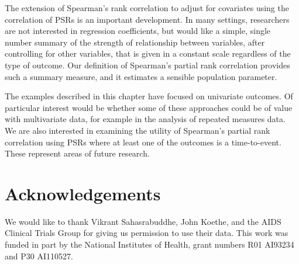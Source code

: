 \documentclass[12pt, usenatbib]{article}
\begin{document}
The extension of Spearman's rank correlation to adjust for covariates using the correlation of PSRs is an important development.  In many settings, researchers are not interested in regression coefficients, but would like a simple, single number summary of the strength of relationship between variables, after controlling for other variables, that is given in a constant scale regardless of the type of outcome.  Our definition of Spearman's partial rank correlation provides such a summary measure, and it estimates a sensible population parameter.

The examples described in this chapter have focused on univariate outcomes.  Of particular interest would be whether some of these approaches could be of value with multivariate data, for example in the analysis of repeated measures data.  We are also interested in examining the utility of Spearman's partial rank correlation using PSRs where at least one of the outcomes is a time-to-event.  These represent areas of future research.



\section{Acknowledgements}

We would like to thank Vikrant Sahasrabuddhe, John Koethe, and the AIDS Clinical Trials Group for giving us permission to use their data.  This work was funded in part by the National Institutes of Health, grant numbers R01 AI93234 and P30 AI110527.





\end{document}
